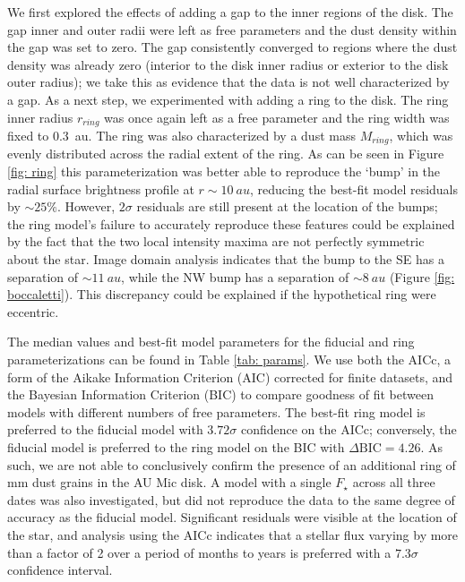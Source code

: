 \documentclass[12pt,oneside]{book}
\begin{document}
We first explored the effects of adding a gap  to the inner regions of the disk. 
The gap inner and outer radii were left as free parameters and the dust density within the gap was set to zero.
The gap consistently converged to regions where the dust density was already zero (interior to the disk inner radius or exterior to the disk outer radius); we take this as evidence that the data is not well characterized by a gap.
As a next step, we experimented with adding a ring to the disk. 
The ring inner radius $r_{ring}$ was once again left as a free parameter and the ring width was fixed to \SI{0.3}{au}.
The ring was also characterized by a dust mass $M_{ring}$, which was evenly distributed across the radial extent of the ring. 
As can be seen in Figure \ref{fig: ring} this parameterization was better able to reproduce the `bump' in the radial surface brightness profile at $r \sim \SI{10}{au}$, reducing the best-fit model residuals by $\sim 25 \%$. 
However, $2 \sigma$ residuals are still present at the location of the bumps; the ring model's failure to accurately reproduce these features could be explained by the fact that the two local intensity maxima are not perfectly symmetric about the star. 
Image domain analysis indicates that the bump to the SE has a separation of $\sim \SI{11}{au}$, while the NW bump has a separation of $\sim \SI{8}{au}$  (Figure \ref{fig: boccaletti}). 
This discrepancy could be explained if the hypothetical ring were eccentric.

The median values and best-fit model parameters for the fiducial and ring parameterizations can be found in Table \ref{tab: params}. 
We use both the AICc, a form of the Aikake Information Criterion (AIC) corrected for finite datasets, and the Bayesian Information Criterion (BIC) to compare goodness of fit between models with different numbers of free parameters.  
The best-fit ring model is preferred to the fiducial model with $3.72 \sigma$ confidence on the AICc; conversely, the fiducial model is preferred to the ring model on the BIC with $\Delta \text{BIC} = 4.26$.
As such, we are not able to conclusively confirm the presence of an additional ring of mm dust grains in the AU Mic disk.
A model with a single $F_\star$ across all three dates was also investigated, but did not reproduce the data to the same degree of accuracy as the fiducial model.
Significant residuals were visible at the location of the star, and analysis using the AICc indicates that a stellar flux varying by more than a factor of 2 over a period of months to years is preferred with a $7.3 \sigma$ confidence interval.
\end{document}
